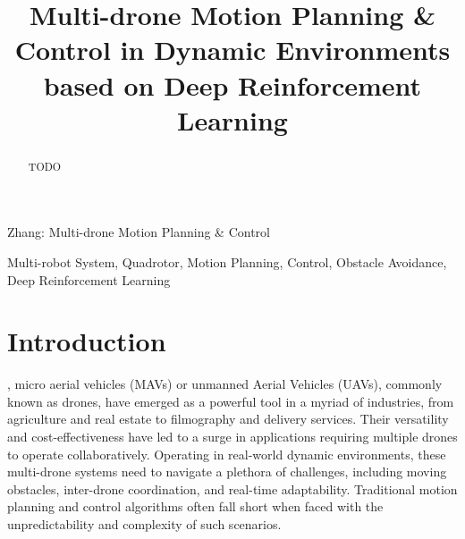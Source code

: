 \documentclass[letterpaper,journal,twoside]{IEEEtran}
\begin{document}
\title{Multi-drone Motion Planning \& Control in Dynamic Environments based on Deep Reinforcement Learning}

\author{
}

\maketitle

\begingroup
\renewcommand\thefootnote{\textsuperscript{1}}
\endgroup

%
{Zhang: Multi-drone Motion Planning \& Control}



\begin{abstract}
TODO
\end{abstract}

\begin{IEEEkeywords}
  Multi-robot System, Quadrotor, Motion Planning, Control, 
  Obstacle Avoidance, Deep Reinforcement Learning
\end{IEEEkeywords}

\section{Introduction}
, micro aerial vehicles (MAVs) or 
unmanned Aerial Vehicles (UAVs), commonly known as drones, 
have emerged as a powerful tool in a myriad of industries, 
from agriculture and real estate to filmography and delivery 
services. 
Their versatility and cost-effectiveness have led to a 
surge in applications requiring multiple drones to operate 
collaboratively. 
Operating in real-world dynamic environments, 
these multi-drone systems need to navigate a plethora of 
challenges, 
including moving obstacles, inter-drone coordination, and 
real-time adaptability. 
Traditional motion planning and control algorithms often fall 
short when faced with the unpredictability and complexity of such 
scenarios.
\end{document}
